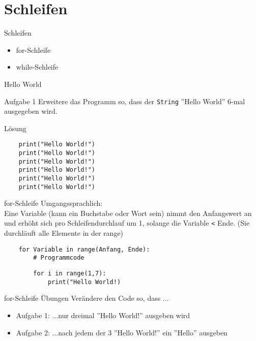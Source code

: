 \section{Schleifen}

\begin{frame}{Schleifen}
\begin{itemize}
	\item for-Schleife
	\item while-Schleife
\end{itemize}
\end{frame}


\begin{frame}[fragile]{Hello World}
\begin{block}{Aufgabe 1}
	Erweitere das Programm so, dass  der \texttt{String} ''Hello World''
	6-mal ausgegeben wird.
\end{block}
\pause{}
\begin{exampleblock}{Lösung}
	\begin{lstlisting}
	print("Hello World!")
	print("Hello World!")
	print("Hello World!")
	print("Hello World!")
	print("Hello World!")
	print("Hello World!")
	\end{lstlisting}
\end{exampleblock}
\end{frame}


\begin{frame}[fragile]{for-Schleife}
	Umgangssprachlich: \\
	Eine Variable (kann ein Buchstabe oder Wort sein) nimmt den Anfangswert an und erhöht sich pro Schleifendurchlauf um 1, solange die Variable \texttt{<} Ende. (Sie durchläuft alle Elemente in der range)
	
	\begin{lstlisting}
	for Variable in range(Anfang, Ende):
		# Programmcode
	\end{lstlisting}
	
	\begin{lstlisting}
		for i in range(1,7):
			print("Hello World!)
	\end{lstlisting}	
\end{frame}

\begin{frame}[fragile]{for-Schleife Übungen}
Verändere den Code so, dass ...
\begin{itemize}
\item Aufgabe 1: ...nur dreimal ''Hello World!'' ausgeben wird\\
\item Aufgabe 2: ...nach jedem der 3 ''Hello World!'' ein ''Hello'' ausgeben
\end{itemize}
\end{frame}


